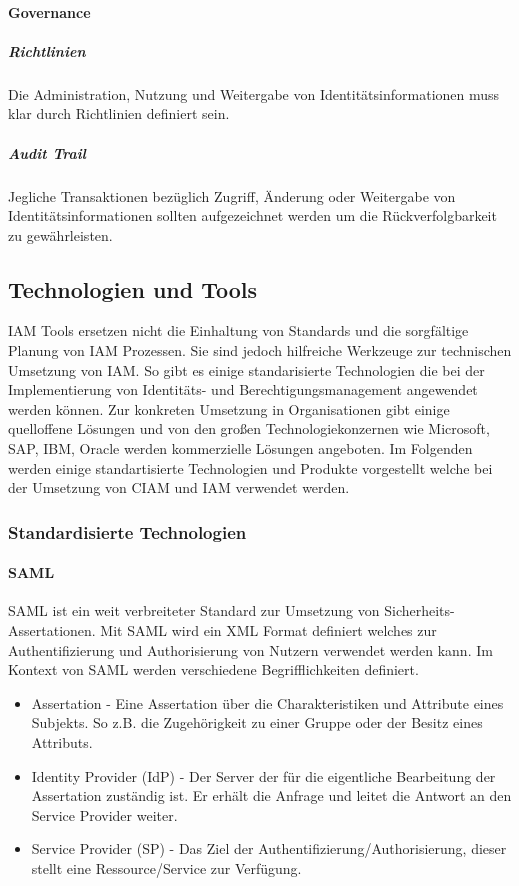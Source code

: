 \documentclass[12pt]{article}
\begin{document}
\paragraph{Governance}
\subparagraph{Richtlinien}
Die Administration, Nutzung und Weitergabe von Identitätsinformationen muss klar durch Richtlinien definiert sein.~\cite{bertino2010identity}
\subparagraph{Audit Trail}
Jegliche Transaktionen bezüglich Zugriff, Änderung oder Weitergabe von Identitätsinformationen sollten aufgezeichnet werden um die Rückverfolgbarkeit zu gewährleisten.~\cite{bertino2010identity}
\subsection{Technologien und Tools}
IAM Tools ersetzen nicht die Einhaltung von Standards und die sorgfältige Planung von IAM Prozessen. Sie sind jedoch hilfreiche Werkzeuge zur technischen Umsetzung von IAM. So gibt es einige standarisierte Technologien die bei der Implementierung von Identitäts- und Berechtigungsmanagement angewendet werden können. Zur konkreten Umsetzung in Organisationen gibt einige quelloffene Lösungen und von den großen Technologiekonzernen wie Microsoft, SAP, IBM, Oracle werden kommerzielle Lösungen angeboten. Im Folgenden werden einige standartisierte Technologien und Produkte vorgestellt welche bei der Umsetzung von CIAM und IAM verwendet werden.
\subsubsection{Standardisierte Technologien}
\paragraph{SAML}
SAML ist ein weit verbreiteter Standard zur Umsetzung von Sicherheits-Assertationen. Mit SAML wird ein XML Format definiert welches zur Authentifizierung und Authorisierung von Nutzern verwendet werden kann. Im Kontext von SAML werden verschiedene Begrifflichkeiten definiert.~\cite{hughes2005security}
\begin{itemize}
  \item Assertation - Eine Assertation über die Charakteristiken und Attribute eines Subjekts. So z.B. die Zugehörigkeit zu einer Gruppe oder der Besitz eines Attributs.
  \item Identity Provider (IdP) - Der Server der für die eigentliche Bearbeitung der Assertation zuständig ist. Er erhält die Anfrage und leitet die Antwort an den Service Provider weiter.
  \item Service Provider (SP) - Das Ziel der Authentifizierung/Authorisierung, dieser stellt eine Ressource/Service zur Verfügung.
\end{itemize}
\end{document}
